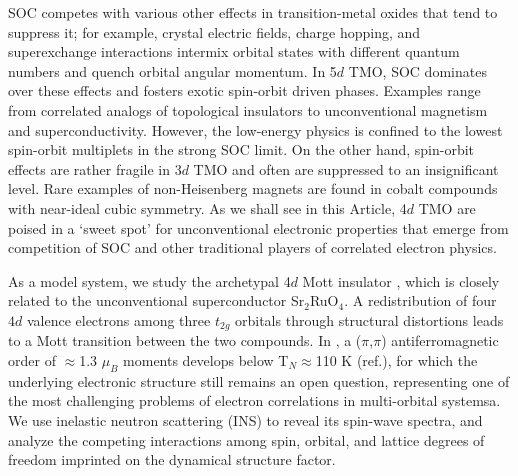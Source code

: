 \noindent
SOC competes\cite{Han_2012} with various other effects in transition-metal oxides that tend to suppress it; for example, crystal electric fields, charge hopping, and superexchange interactions intermix orbital states with different quantum numbers and quench orbital angular momentum. In 5$d$ TMO, SOC dominates over these effects and fosters exotic spin-orbit driven phases\cite{Kim_2008}\cite{Kim_2009}. Examples range from correlated analogs of topological insulators\cite{Witczak_Krempa_2014} to unconventional magnetism\cite{Jackeli_2009}  and superconductivity\cite{Kim_2014,Kim2015,Yan2015}. However, the low-energy physics is confined to the lowest spin-orbit multiplets in the strong SOC limit. On the other hand, spin-orbit effects are rather fragile in 3$d$ TMO and often are suppressed to an insignificant level. Rare examples of non-Heisenberg magnets are found in cobalt compounds with near-ideal cubic symmetry\cite{BREED1969205}. As we shall see in this Article, 4$d$ TMO are poised in a `sweet spot' for unconventional electronic properties that emerge from competition of SOC and other traditional players of correlated electron physics. 
  
As a model system, we study the archetypal 4$d$ Mott insulator \CROns\cite{Nakatsuji_1997}, which is closely related to the unconventional superconductor Sr$_2$RuO$_4$\cite{Maeno_1994}. A redistribution of four $4d$ valence electrons among three $t_{2g}$ orbitals through structural distortions leads to a Mott transition between the two compounds. In \CROns, a ($\pi$,$\pi$) antiferromagnetic order of $\approx$1.3 $\mu_B$ moments develops below T$_N$$\approx$110 K (ref.\cite{Braden_1998}), for which the underlying electronic structure still remains an open question, representing one of the most challenging problems of electron correlations in multi-orbital systemsa\cite{Anisimov_2002}. We use  inelastic neutron scattering (INS) to reveal its spin-wave spectra, and analyze the competing interactions among spin, orbital, and lattice degrees of freedom imprinted on the dynamical structure factor.  

  
  
  
  
  
  
  
  
  
  
  